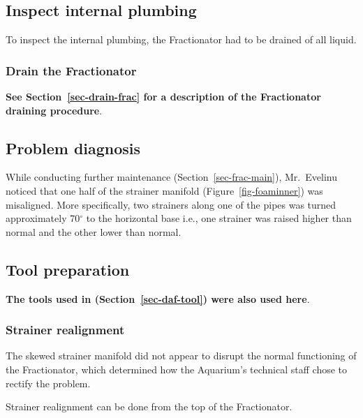 \documentclass[
  12pt,
]{report}
\begin{document}
\hypertarget{inspect-internal-plumbing-1}{%
\subsection{Inspect internal
plumbing}\label{inspect-internal-plumbing-1}}

To inspect the internal plumbing, the Fractionator had to be drained of
all liquid.

\hypertarget{drain-the-fractionator}{%
\subsubsection{Drain the Fractionator}\label{drain-the-fractionator}}

\textbf{See Section~\ref{sec-drain-frac} for a description of the
Fractionator draining procedure}.

\hypertarget{problem-diagnosis-1}{%
\subsection{Problem diagnosis}\label{problem-diagnosis-1}}

While conducting further maintenance (Section~\ref{sec-frac-main}),
Mr.~Evelinu noticed that one half of the strainer manifold
(Figure~\ref{fig-foaminner}) was misaligned. More specifically, two
strainers along one of the pipes was turned approximately 70\(^\circ\)
to the horizontal base i.e., one strainer was raised higher than normal
and the other lower than normal.

\hypertarget{tool-preparation-2}{%
\subsection{Tool preparation}\label{tool-preparation-2}}

\textbf{The tools used in (Section~\ref{sec-daf-tool}) were also used
here}.

\hypertarget{sec-foam-realign}{%
\subsubsection{Strainer realignment}\label{sec-foam-realign}}

{The skewed strainer manifold did not appear to disrupt the normal
functioning of the Fractionator, which determined how the Aquarium's
technical staff chose to rectify the problem}.

{Strainer realignment can be done from the top of the Fractionator}.
\end{document}
